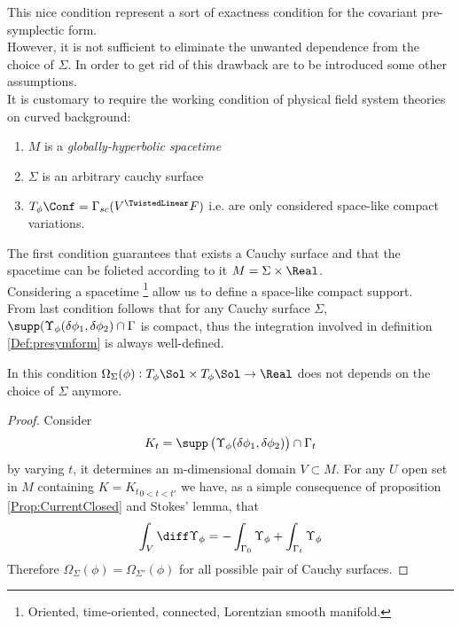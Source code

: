 \documentclass[a4paper,12pt]{scrartcl}  %
\begin{document}
This nice condition represent a sort of exactness condition for the covariant pre-symplectic form.\\
However, it is not sufficient to eliminate the unwanted dependence from the choice of $\Sigma$.
In order to get rid of this drawback are to be introduced some other assumptions.\\
It is customary to require the working condition of physical field system theories on curved background:
\begin{enumerate}
	\item $M$ is a \emph{globally-hyperbolic spacetime}
	\item $\Sigma$ is an arbitrary cauchy surface
	\item $T_\phi \Conf =\Gamma_{sc} (V^\TwistedLinear F )$ i.e. are only considered space-like compact variations.
\end{enumerate}
The first condition guarantees that exists a Cauchy surface and that the spacetime can be folieted according to it $M= \Sigma \times \Real$.\\
Considering a spacetime \footnote{Oriented, time-oriented, connected, Lorentzian smooth manifold. } allow us to define a space-like compact support.\\
From last condition follows that for any Cauchy surface $\Sigma$, $ \supp(\Upsilon_\phi (\delta \phi_1, \delta \phi_2) \cap \Gamma$ is compact, thus the integration involved in definition \ref{Def:presymform} is always well-defined.

\begin{proposition}
	In this condition $\Omega_\Sigma (\phi): T_\phi \Sol \times T_\phi \Sol \rightarrow \Real$ does not depends on the choice of $\Sigma$ anymore.
\end{proposition}
\begin{proof}
	Consider 
	\begin{displaymath}
		K_t = \supp\left(\Upsilon_\phi (\delta \phi_1, \delta \phi_2) \right) \cap \Gamma_t
	\end{displaymath}
	by varying $t$, it determines an m-dimensional domain $V \subset M$.
	For any $U$ open set in $M$ containing $K={K_t}_{0<t<t'}$ we have, as a simple consequence of proposition \ref{Prop:CurrentClosed} and Stokes' lemma, that
	\begin{displaymath}
		\int_V \diff \Upsilon_\phi = - \int_{\Gamma_0} \Upsilon_\phi +\int_{\Gamma_t} \Upsilon_\phi 
	\end{displaymath}
	Therefore $\Omega_\Sigma (\phi) = \Omega_{\Sigma'} (\phi)$ for all possible pair of Cauchy surfaces.
\end{proof}
\end{document}
